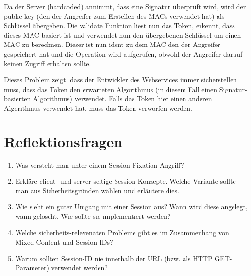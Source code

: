 Da der Server (hardcoded) annimmt, dass eine Signatur überprüft wird, wird der public key (den der Angreifer zum Erstellen des MACs verwendet hat) als Schlüssel übergeben. Die validate Funktion liest nun das Token, erkennt, dass dieses MAC-basiert ist und verwendet nun den übergebenen Schlüssel um einen MAC zu berechnen. Dieser ist nun ident zu dem MAC den der Angreifer gespeichert hat und die Operation wird aufgerufen, obwohl der Angreifer darauf keinen Zugriff erhalten sollte.

Dieses Problem zeigt, dass der Entwickler des Webservices immer sicherstellen muss, dass das Token den erwarteten Algorithmus (in diesem Fall einen Signatur-basierten Algorithmus) verwendet. Falls das Token hier einen anderen Algorithmus verwendet hat, muss das Token verworfen werden.


\section{Reflektionsfragen}

\begin{enumerate}
	\item Was versteht man unter einem Session-Fixation Angriff?
	\item Erkläre client- und server-seitige Session-Konzepte. Welche Variante sollte man aus Sicherheitsgründen wählen und erläutere dies.
	\item Wie sieht ein guter Umgang mit einer Session aus? Wann wird diese angelegt, wann gelöscht. Wie sollte sie implementiert werden?
	\item Welche sicherheits-relevenaten Probleme gibt es im Zusammenhang von Mixed-Content und Session-IDs?
	\item Warum sollten Session-ID nie innerhalb der URL (bzw. als HTTP GET-Parameter) verwendet werden?
\end{enumerate}
